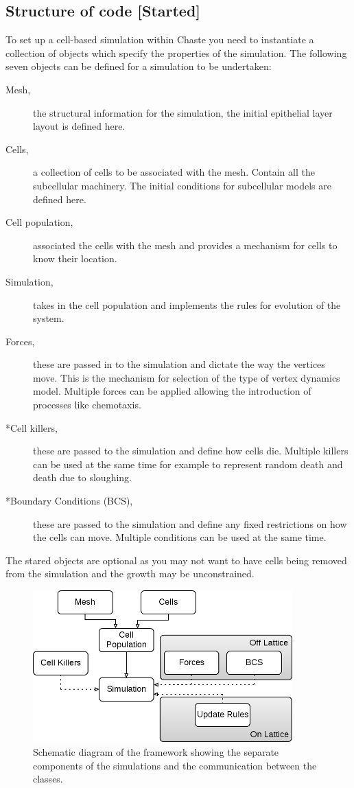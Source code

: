 \documentclass[a4paper,12pt]{article}
\newcommand{\todo}{[Started]}
\begin{document}
\subsection{Structure of code \todo} \label{sec:code}
To set up a cell-based simulation within Chaste you need to instantiate a collection of objects which specify the properties of the simulation. 
The following seven objects can be defined for a simulation to be undertaken:
\begin{description}
  \item [Mesh,] the structural information for the simulation, the initial epithelial layer 
  layout is defined here.
  \item [Cells,] a collection of cells to be associated with the mesh. Contain all the subcellular 
  machinery. The initial conditions for  subcellular models are defined here.
  \item [Cell population,] associated the cells with the mesh and provides a mechanism for 
  cells to know their location.
  \item [Simulation,] takes in the cell population and implements the rules for evolution of 
  the system.
  \item [Forces,] these are passed in to the simulation and dictate the way the vertices move. 
  This is the mechanism for selection of the type of vertex dynamics model. Multiple forces 
  can be applied allowing the introduction of processes like chemotaxis.
  \item [*Cell killers,] these are passed to the simulation and define how cells die. Multiple 
  killers can be used at the same time for example to represent random death and death due to 
  sloughing.
  \item [*Boundary Conditions (BCS),] these are passed to the simulation and define any fixed 
  restrictions on how the cells can move. Multiple conditions can be used at the same time.
\end{description}
The stared objects are optional as you may not want to have cells being removed from the simulation and the growth may be unconstrained. 


\begin{figure}[tbhp]
        \centering
        \includegraphics[width=10cm]{Figs/CellBasedStructure}
        \caption{Schematic diagram of the framework showing the separate components of the simulations and the communication between the classes.} 
       \label{fig:SimulationComponents}
\end{figure}
\end{document}
